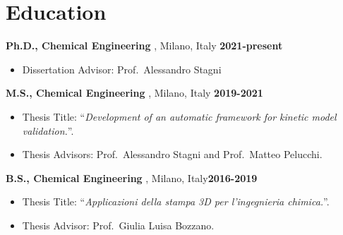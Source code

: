 \section{\sc Education}

{\bf Ph.D., Chemical Engineering} \polimi, Milano, Italy \hfill {\bf 2021-present}\\
\vspace*{-.1in}
\begin{itemize}
    \item[ ] Dissertation Advisor: Prof.\ Alessandro Stagni
\end{itemize}

{\bf M.S., Chemical Engineering} \polimi, Milano, Italy \hfill {\bf 2019-2021}\\
\vspace*{-.1in}
\begin{itemize}
    \item[ ] Thesis Title: ``{\it Development of an automatic framework for kinetic model validation.}''.
    \item[ ] Thesis Advisors: Prof.\ Alessandro Stagni and Prof.\ Matteo Pelucchi.
\end{itemize}

{\bf B.S., Chemical Engineering} \polimi, Milano, Italy\hfill {\bf 2016-2019}\\
\vspace*{-.1in}
\begin{itemize}
    \item[ ] Thesis Title: ``{\it Applicazioni della stampa 3D per l'ingegnieria chimica.}''.
    \item[ ] Thesis Advisor: Prof.\ Giulia Luisa Bozzano.
\end{itemize}

